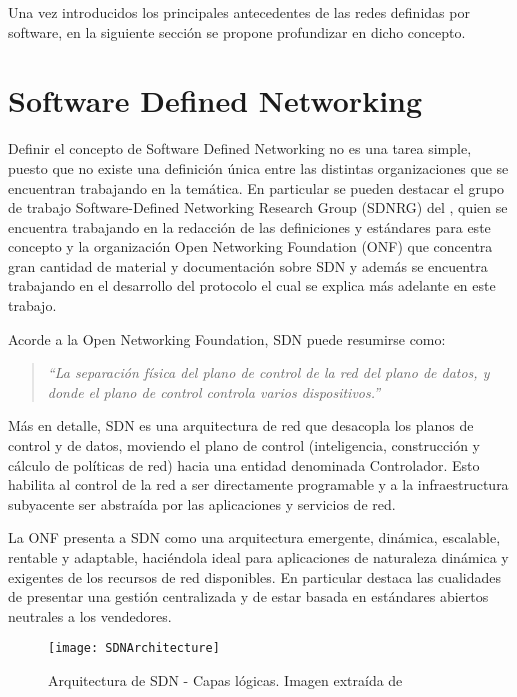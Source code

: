 Una vez introducidos los principales antecedentes de las redes definidas por software, en la siguiente secci\'on se propone profundizar en dicho concepto.

\section{Software Defined Networking}
\label{section2.2}

Definir el concepto de Software Defined Networking no es una tarea simple, puesto que no existe una definici\'on \'unica entre las distintas organizaciones que se encuentran trabajando en la temática. En particular se pueden destacar el grupo de trabajo Software-Defined Networking Research Group  
 (SDNRG) del , quien se encuentra trabajando en la redacción de las definiciones y estándares para este concepto y la organización Open Networking Foundation (ONF) \cite{ONF} que concentra gran cantidad de material y documentación sobre SDN y adem\'as se encuentra trabajando en el desarrollo del protocolo  el cual se explica m\'as adelante en este trabajo.

Acorde a la Open Networking Foundation, SDN puede resumirse como:

\begin{quote}
\textit{``La separación física del plano de control de la red del plano de datos, y donde el plano de control controla varios dispositivos.''}
\end{quote}

Más en detalle, SDN es una arquitectura de red que desacopla los planos de control y de datos, moviendo el plano de control (inteligencia, construcción y c\'alculo de políticas de red) hacia una entidad denominada Controlador. Esto habilita al control de la red a ser directamente programable y a la infraestructura subyacente ser abstraída por las aplicaciones y servicios de red.

La ONF presenta a SDN como una arquitectura emergente, dinámica, escalable, rentable y adaptable, haciéndola ideal para aplicaciones de naturaleza dinámica y exigentes de los recursos de red disponibles. En particular destaca las cualidades de presentar una gestión centralizada y de estar basada en estándares abiertos neutrales a los vendedores.

\begin{figure}[htbp!] 
\centering    
\texttt{[image: SDNArchitecture]}
\caption[Arquitectura de SDN - Capas lógicas]{Arquitectura de SDN - Capas lógicas. Imagen extraída de \cite{ONF}}
\label{fig:SDNArchitecture}
\end{figure}

